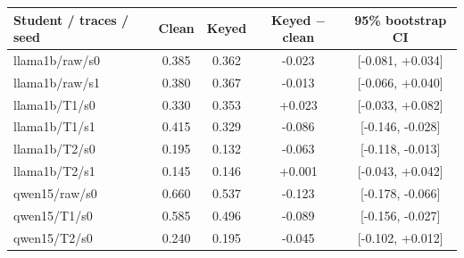 \begin{tabular}{lcccc}
\toprule
Student / traces / seed & Clean & Keyed & Keyed $-$ clean & 95\% bootstrap CI\\
\midrule
llama1b/raw/s0 & 0.385 & 0.362 & -0.023 & [-0.081, +0.034]\\
llama1b/raw/s1 & 0.380 & 0.367 & -0.013 & [-0.066, +0.040]\\
llama1b/T1/s0 & 0.330 & 0.353 & +0.023 & [-0.033, +0.082]\\
llama1b/T1/s1 & 0.415 & 0.329 & -0.086 & [-0.146, -0.028]\\
llama1b/T2/s0 & 0.195 & 0.132 & -0.063 & [-0.118, -0.013]\\
llama1b/T2/s1 & 0.145 & 0.146 & +0.001 & [-0.043, +0.042]\\
qwen15/raw/s0 & 0.660 & 0.537 & -0.123 & [-0.178, -0.066]\\
qwen15/T1/s0 & 0.585 & 0.496 & -0.089 & [-0.156, -0.027]\\
qwen15/T2/s0 & 0.240 & 0.195 & -0.045 & [-0.102, +0.012]\\
\bottomrule
\end{tabular}
